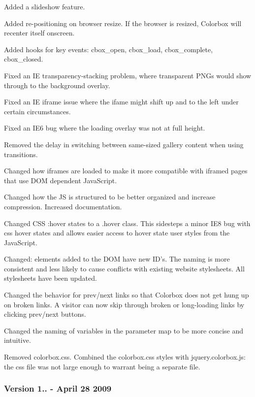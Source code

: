 \begin{DoxyItemize}
\item Added a slideshow feature.
\item Added re-\/positioning on browser resize. If the browser is resized, Colorbox will recenter itself onscreen.
\item Added hooks for key events\-: cbox\-\_\-open, cbox\-\_\-load, cbox\-\_\-complete, cbox\-\_\-closed.
\item Fixed an I\-E transparency-\/stacking problem, where transparent P\-N\-Gs would show through to the background overlay.
\item Fixed an I\-E iframe issue where the ifame might shift up and to the left under certain circumstances.
\item Fixed an I\-E6 bug where the loading overlay was not at full height.
\item Removed the delay in switching between same-\/sized gallery content when using transitions.
\item Changed how iframes are loaded to make it more compatible with iframed pages that use D\-O\-M dependent Java\-Script.
\item Changed how the J\-S is structured to be better organized and increase compression. Increased documentation.
\item Changed C\-S\-S \-:hover states to a .hover class. This sidesteps a minor I\-E8 bug with css hover states and allows easier access to hover state user styles from the Java\-Script.
\item Changed\-: elements added to the D\-O\-M have new I\-D's. The naming is more consistent and less likely to cause conflicts with existing website stylesheets. All stylesheets have been updated.
\item Changed the behavior for prev/next links so that Colorbox does not get hung up on broken links. A visitor can now skip through broken or long-\/loading links by clicking prev/next buttons.
\item Changed the naming of variables in the parameter map to be more concise and intuitive.
\item Removed colorbox.\-css. Combined the colorbox.\-css styles with jquery.\-colorbox.\-js\-: the css file was not large enough to warrant being a separate file.
\end{DoxyItemize}

\subsubsection*{Version 1.. -\/ April 28 2009}


